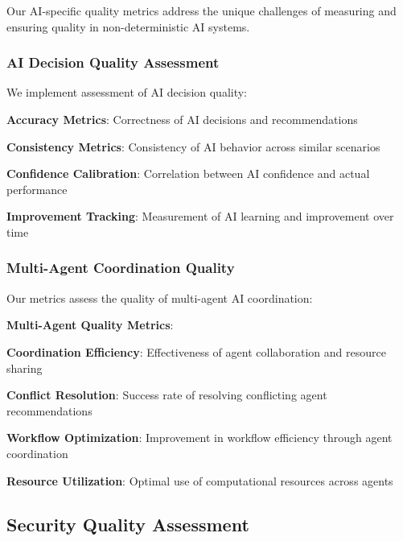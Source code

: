Our AI-specific quality metrics address the unique challenges of measuring and ensuring quality in non-deterministic AI systems.

\subsubsection*{AI Decision Quality Assessment}

We implement assessment of AI decision quality:

\begin{compactlist}
    \item \textbf{Accuracy Metrics}: Correctness of AI decisions and recommendations
    \item \textbf{Consistency Metrics}: Consistency of AI behavior across similar scenarios
    \item \textbf{Confidence Calibration}: Correlation between AI confidence and actual performance
    \item \textbf{Improvement Tracking}: Measurement of AI learning and improvement over time
\end{compactlist}

\subsubsection*{Multi-Agent Coordination Quality}

Our metrics assess the quality of multi-agent AI coordination:

\begin{alertbox}
\textbf{Multi-Agent Quality Metrics}:
\begin{compactlist}
    \item \textbf{Coordination Efficiency}: Effectiveness of agent collaboration and resource sharing
    \item \textbf{Conflict Resolution}: Success rate of resolving conflicting agent recommendations
    \item \textbf{Workflow Optimization}: Improvement in workflow efficiency through agent coordination
    \item \textbf{Resource Utilization}: Optimal use of computational resources across agents
\end{compactlist}
\end{alertbox}

\subsection*{Security Quality Assessment}

